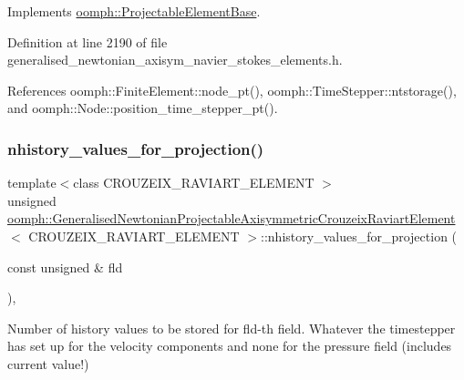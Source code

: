 Implements \hyperlink{classoomph_1_1ProjectableElementBase_ab4ecd0cd24000a3ed675dc7198203c1f}{oomph\+::\+Projectable\+Element\+Base}.



Definition at line 2190 of file generalised\+\_\+newtonian\+\_\+axisym\+\_\+navier\+\_\+stokes\+\_\+elements.\+h.



References oomph\+::\+Finite\+Element\+::node\+\_\+pt(), oomph\+::\+Time\+Stepper\+::ntstorage(), and oomph\+::\+Node\+::position\+\_\+time\+\_\+stepper\+\_\+pt().

\mbox{\label{classoomph_1_1GeneralisedNewtonianProjectableAxisymmetricCrouzeixRaviartElement_a849ba101f89e2b21525d4131e868f672}} 
\subsubsection{\texorpdfstring{nhistory\+\_\+values\+\_\+for\+\_\+projection()}{nhistory\_values\_for\_projection()}}
{\footnotesize\ttfamily template$<$class C\+R\+O\+U\+Z\+E\+I\+X\+\_\+\+R\+A\+V\+I\+A\+R\+T\+\_\+\+E\+L\+E\+M\+E\+NT $>$ \\
unsigned \hyperlink{classoomph_1_1GeneralisedNewtonianProjectableAxisymmetricCrouzeixRaviartElement}{oomph\+::\+Generalised\+Newtonian\+Projectable\+Axisymmetric\+Crouzeix\+Raviart\+Element}$<$ C\+R\+O\+U\+Z\+E\+I\+X\+\_\+\+R\+A\+V\+I\+A\+R\+T\+\_\+\+E\+L\+E\+M\+E\+NT $>$\+::nhistory\+\_\+values\+\_\+for\+\_\+projection (\begin{DoxyParamCaption}\item[{const unsigned \&}]{fld }\end{DoxyParamCaption})\hspace{0.3cm}{\ttfamily [inline]}, {\ttfamily [virtual]}}



Number of history values to be stored for fld-\/th field. Whatever the timestepper has set up for the velocity components and none for the pressure field (includes current value!) 



